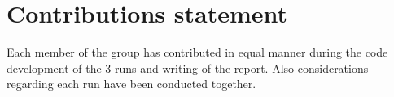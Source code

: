 \section{Contributions statement}

Each member of the group has contributed in equal manner during the code development of the $3$ runs and writing of the report. Also considerations regarding each run have been conducted together. 